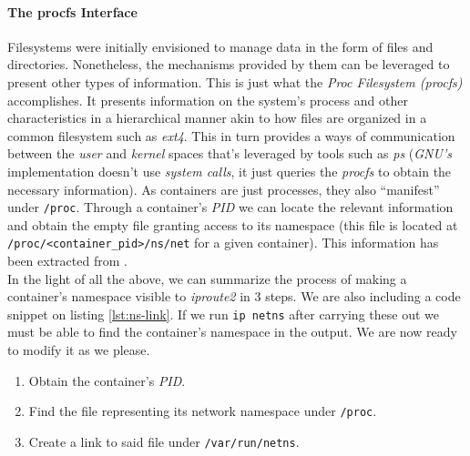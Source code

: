                 \paragraph{The procfs Interface}
                    Filesystems were initially envisioned to manage data in the form of files and directories. Nonetheless, the mechanisms provided by them can be leveraged to present other types of information. This is just what the \textit{Proc Filesystem (procfs)} accomplishes. It presents information on the system's process and other characteristics in a hierarchical manner akin to how files are organized in a common filesystem such as \textit{ext4}. This in turn provides a ways of communication between the \textit{user} and \textit{kernel} spaces that's leveraged by tools such as \textit{ps} (\textit{GNU's} implementation doesn't use \textit{system calls}, it just queries the \textit{procfs} to obtain the necessary information). As containers are just processes, they also ``manifest'' under \texttt{/proc}. Through a container's \textit{PID} we can locate the relevant information and obtain the empty file granting access to its namespace (this file is located at \texttt{/proc/<container\_pid>/ns/net} for a given container). This information has been extracted from \cite{bib:man-procfs}.\\

                In the light of all the above, we can summarize the process of making a container's namespace visible to \textit{iproute2} in $3$ steps. We are also including a code snippet on listing \ref{lst:ns-link}. If we run \texttt{ip netns} after carrying these out we must be able to find the container's namespace in the output. We are now ready to modify it as we please.\\

                \begin{enumerate}
                    \item Obtain the container's \textit{PID}.
                    \item Find the file representing its network namespace under \texttt{/proc}.
                    \item Create a link to said file under \texttt{/var/run/netns}.
                \end{enumerate}

